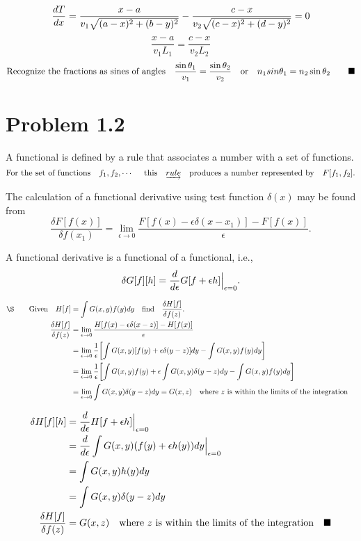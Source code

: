 \documentclass{memoir}
\begin{document}
\[\dv {T} {x} = \frac{x-a}{v_1\sqrt {(a-x)^2+(b-y)^2}} - \frac{c-x}{v_2\sqrt {(c-x)^2+(d-y)^2}}=0  \]
\[\frac{x-a}{v_1 L_1} = \frac{c-x}{v_2 L_2}  \]
\[\qq*{Recognize the fractions as sines of angles} \frac{\sin \theta_1}{v_1} = \frac{\sin \theta_2}{v_2} \qor n_1 sin \theta_1 = n_2 \sin \theta_2\qquad \blacksquare\]




\section*{Problem 1.2}

A functional is defined by a rule that associates a number with a set of functions.
\[\qq*{For the set of functions}f_1, f_2, \cdots\qq{ this}\underrightarrow{rule}\qq{produces a number represented by} F[f_1, f_2].\]

The calculation of a functional derivative using test function $\delta(x)$ may be found from
\[\frac{\delta F[f(x)]}{\delta f(x_1)}=\lim_{\epsilon\to 0}\frac{F[f(x)-\epsilon\delta(x-x_1)]-F[f(x)]}{\epsilon}.    \]

A functional derivative is a functional of a functional, i.e.,
\[\var{G[f][h]}=\dv{\epsilon}G[f+\epsilon h]\Big\vert_{\epsilon=0}.\]


\begin{align*}
    \qq*{\S}\qq{Given}H[f]          & =\int G(x,y)f(y)dy\qq{find}\frac{\delta H[f]}{\delta f(z)}.                  \\
    \fdv{H[f]}{f(z)}&=\lim_{\epsilon\to 0}\frac{H[f(x)-\epsilon\delta(x-z)]-H[f(x)]}{\epsilon} \\
    &=\lim_{\epsilon\to 0}\frac{1}{\epsilon}\bqty{\int G(x,y)\bqty{f(y)+\epsilon\delta(y-z)}dy-\int G(x,y)f(y)dy}\\
    &=\lim_{\epsilon\to 0}\frac{1}{\epsilon}\bqty{\int G(x,y)f(y)+\epsilon\int G(x,y)\delta(y-z)dy-\int G(x,y)f(y)dy}\\
    &=\lim_{\epsilon\to 0}\int G(x,y)\delta(y-z)dy =G(x,z) \qq{where $z$ is within the limits of the integration}\\
\end{align*}


\begin{align*}
    \delta H[f][h]                  & =\frac{d}{d\epsilon}H[f+\epsilon h]\Big\vert_{\epsilon=0}                   \\
                                    & =\frac{d}{d\epsilon}\int G(x,y)(f(y)+\epsilon h(y))dy\Big\vert_{\epsilon=0} \\
                                    & =\int G(x,y)h(y)dy                                                          \\
                                    & =\int G(x,y)\delta(y-z)dy                                                   \\
    \frac{\delta H[f]}{\delta f(z)} & =G(x,z) \qq{where $z$ is within the limits of the integration} \blacksquare\\
\end{align*}
\end{document}
